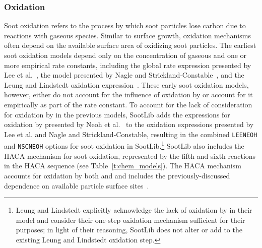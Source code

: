 \documentclass[preprint,letterpaper]{elsarticle}
\begin{document}

\subsubsection{Oxidation}
\label{s:oxi}

Soot oxidation refers to the process by which soot particles lose carbon due to reactions with gaseous species. Similar to surface growth, oxidation mechanisms often depend on the available surface area of oxidizing soot particles.
The earliest soot oxidation models depend only on the concentration of gaseous  and one or more empirical rate constants, including the global rate expression presented by Lee et al.~\cite{Lee_1962}, the model presented by Nagle and Strickland-Constable~\cite{Nagle_1962}, and the Leung and Lindstedt oxidation expression~\cite{Leung_1991}.
These early soot oxidation models, however, either do not account for the influence of oxidation by  or account for it empirically as part of the rate constant. To account for the lack of consideration for oxidation by  in the previous models, SootLib adds the expressions for oxidation by  presented by Neoh et al.~\cite{Neoh_1980,Neoh_1981} to the oxidation expressions presented by Lee et al. and Nagle and Strickland-Constable, resulting in the combined \texttt{LEE\textunderscore NEOH} and \texttt{NSC\textunderscore NEOH} options for soot oxidation in SootLib.\footnote{Leung and Lindstedt explicitly acknowledge the lack of oxidation by  in their model and consider their one-step oxidation mechanism sufficient for their purposes; in light of their reasoning, SootLib does not alter or add to the existing Leung and Lindstedt oxidation step.}
SootLib also includes the HACA mechanism for soot oxidation, represented by the fifth and sixth reactions in the HACA sequence (see Table~\ref{t:chem_models}). The HACA mechanism accounts for oxidation by both  and  and includes the previously-discussed dependence on available particle surface sites~\cite{Appel_2000}.
\end{document}
